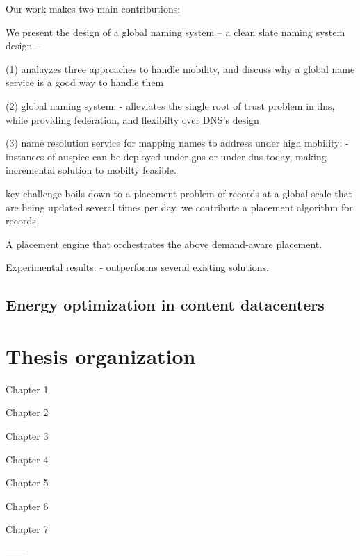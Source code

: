 Our work makes two main contributions:

We present the design of a global naming system -- a clean slate naming system design -- 





(1) analayzes three approaches to handle mobility, and discuss why a global name service is a good way to handle them

(2) global naming system: - alleviates the single root of trust problem in dns, while providing federation, and flexibilty over DNS's design

(3) name resolution service for mapping names to address under high mobility: - instances of auspice can be deployed under gns or under dns today, making incremental solution to mobilty feasible.

key challenge boils down to a placement problem of records at a global scale that are being updated several times per day. we contribute a placement algorithm for records 

A placement engine that orchestrates the above demand-aware placement.

Experimental results: - outperforms several existing solutions.





\subsection{Energy optimization in content datacenters}



\section{Thesis organization}

Chapter 1

Chapter 2

Chapter 3

Chapter 4

Chapter 5

Chapter 6

Chapter 7

------

